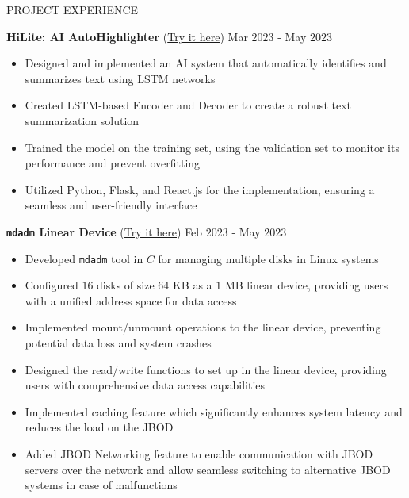 \documentclass{resume} %
\begin{document}

\begin{rSection}{PROJECT EXPERIENCE}

\textbf{ HiLite: AI AutoHighlighter }{(\href{https://github.com/harshitjain17/HiLite-AIAutoHighlighter}{Try it here})} \hfill Mar $2023$ - May $2023$
\begin{itemize}[itemsep = -4pt]
    \item Designed and implemented an AI system that automatically identifies and summarizes text using LSTM networks
    \item Created LSTM-based Encoder and Decoder to create a robust text summarization solution
    \item Trained the model on the training set, using the validation set to monitor its performance and prevent overfitting
    \item Utilized Python, Flask, and React.js for the implementation, ensuring a seamless and user-friendly interface
\end{itemize}

\textbf{ \texttt{mdadm} Linear Device }{(\href{https://github.com/harshitjain17/mdadm-Linear-Device}{Try it here})} \hfill Feb $2023$ - May $2023$
\begin{itemize}[itemsep = -4pt]
    \item Developed \verb|mdadm| tool in $C$ for managing multiple disks in Linux systems
    \item Configured $16$ disks of size $64$ KB as a $1$ MB linear device, providing users with a unified address space for data access
    \item Implemented mount/unmount operations to the linear device, preventing potential data loss and system crashes
    \item Designed the read/write functions to set up in the linear device, providing users with comprehensive data access capabilities
    \item Implemented caching feature which significantly enhances system latency and reduces the load on the JBOD
    \item Added JBOD Networking feature to enable communication with JBOD servers over the network and allow seamless switching to alternative JBOD systems in case of malfunctions
\end{itemize}


\end{rSection}
\end{document}
